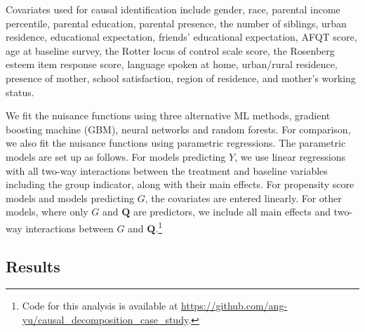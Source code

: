 \documentclass[12pt,a4paper]{article}
\def\Q{{\boldsymbol Q}}
\begin{document}
Covariates used for causal identification include gender, race, parental income percentile, parental education, parental presence, the number of siblings, urban residence, educational expectation, friends' educational expectation, AFQT score, age at baseline survey, the Rotter locus of control scale score, the Rosenberg esteem item response score, language spoken at home, urban/rural residence, presence of mother, school satisfaction, region of residence, and mother's working status. 

We fit the nuisance functions using three alternative ML methods, gradient boosting machine (GBM), neural networks and random forests. For comparison, we also fit the nuisance functions using parametric regressions. The parametric models are set up as follows. For models predicting $Y$, we use linear regressions with all two-way interactions between the treatment and baseline variables including the group indicator, along with their main effects. For propensity score models and models predicting $G$, the covariates are entered linearly. For other models, where only $G$ and $\Q$ are predictors, we include all main effects and two-way interactions between $G$ and $\Q$.\footnote{Code for this analysis is available at \url{https://github.com/ang-yu/causal_decomposition_case_study}.}

\subsection{Results}
\end{document}
